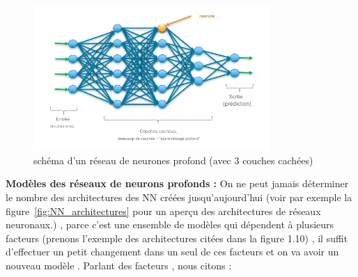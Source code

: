     \begin{figure}[htbp]
     \centering  \includegraphics[width=0.8\textwidth,height=0.3\textheight]{img/NN.png}
     \caption{schéma d'un réseau de neurones profond (avec 3 couches cachées) }
     \label{fig:example10}
     \end{figure}
 \newpage
 
 \textbf{Modèles des réseaux de neurons profonds :} 
On ne peut jamais déterminer le nombre des architectures des NN créées jusqu'aujourd'hui (voir par exemple la figure~\ref{fig:NN_architectures} pour un aperçu des architectures de réseaux neuronaux.) , parce c'est une ensemble de modèles qui dépendent à plusieurs facteurs (prenons l'exemple des architectures citées dans la figure 1.10) , il suffit d'effectuer un petit changement dans un seul de ces facteurs et on va avoir un nouveau modèle . Parlant des facteurs , nous citons :

